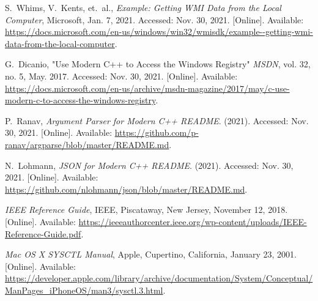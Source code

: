 \documentclass[conference]{IEEEtran}
\begin{document}
\begin{thebibliography}{2}

S.~Whims, V.~Kents, et.~al., \textit{Example: Getting WMI Data from the Local Computer}, Microsoft, Jan. 7, 2021. Accessed: Nov. 30, 2021. [Online]. Available: \url{https://docs.microsoft.com/en-us/windows/win32/wmisdk/example--getting-wmi-data-from-the-local-computer}.

G.~Dicanio, "Use Modern C++ to Access the Windows Registry" \textit{MSDN}, vol. 32, no. 5, May. 2017. Accessed: Nov. 30, 2021. [Online]. Available: \url{https://docs.microsoft.com/en-us/archive/msdn-magazine/2017/may/c-use-modern-c-to-access-the-windows-registry}.

P.~Ranav, \textit{Argument Parser for Modern C++ README}. (2021). Accessed: Nov. 30, 2021. [Online]. Available: \url{https://github.com/p-ranav/argparse/blob/master/README.md}.

N.~Lohmann, \textit{JSON for Modern C++ README}. (2021). Accessed: Nov. 30, 2021. [Online]. Available: \url{https://github.com/nlohmann/json/blob/master/README.md}.

\textit{IEEE Reference Guide}, IEEE, Piscataway, New Jersey, November 12, 2018. [Online]. Available: \url{https://ieeeauthorcenter.ieee.org/wp-content/uploads/IEEE-Reference-Guide.pdf}.

\textit{Mac OS X SYSCTL Manual}, Apple, Cupertino, California, January 23, 2001. [Online]. Available: \url{https://developer.apple.com/library/archive/documentation/System/Conceptual/ManPages_iPhoneOS/man3/sysctl.3.html}.

\end{thebibliography}
\end{document}
